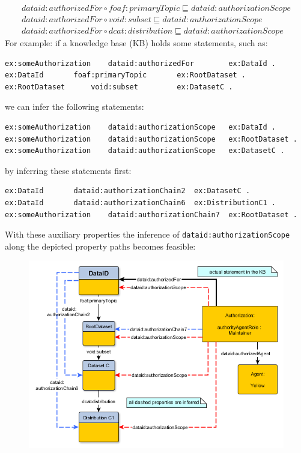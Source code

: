 \documentclass[a4paper,english,twoside,BCOR1.5cm,headsepline,DIV12,appendixprefix,final,12pt]{scrbook}
\newcommand{\prop}[1]{{{\texttt{#1}}}}
\begin{document}
{\footnotesize
\vspace*{-0.5cm}
\begin{align*}
dataid:authorizedFor \circ foaf:primaryTopic \sqsubseteq dataid:authorizationScope\\
dataid:authorizedFor \circ void:subset \sqsubseteq dataid:authorizationScope\\
dataid:authorizedFor \circ dcat:distribution \sqsubseteq dataid:authorizationScope
\end{align*}
}%
For example: if a knowledge base (KB) holds some statements, such as:
\begin{lstlisting}[language=ttl, captionpos=b,label=lst:coresuperset,linewidth=\columnwidth,breaklines=true]
ex:someAuthorization	dataid:authorizedFor		ex:DataId .
ex:DataId		foaf:primaryTopic		ex:RootDataset .
ex:RootDataset		void:subset			ex:DatasetC . 
\end{lstlisting}

we can infer the following statements:
\begin{lstlisting}[language=ttl, captionpos=b,label=lst:coresuperset,linewidth=\columnwidth,breaklines=true]
ex:someAuthorization 	dataid:authorizationScope 	ex:DataId .
ex:someAuthorization 	dataid:authorizationScope 	ex:RootDataset .
ex:someAuthorization 	dataid:authorizationScope 	ex:DatasetC . 
\end{lstlisting}

by inferring these statements first:	
\begin{lstlisting}[language=ttl, captionpos=b,label=lst:coresuperset,linewidth=\columnwidth,breaklines=true]
ex:DataId 		dataid:authorizationChain2 	ex:DatasetC .
ex:DataId	 	dataid:authorizationChain6 	ex:DistributionC1 .
ex:someAuthorization 	dataid:authorizationChain7 	ex:RootDataset .
\end{lstlisting}

With these auxiliary properties the inference of \prop{dataid:authorizationScope} along the depicted property paths becomes feasible:


\begin{figure}[!htbp]
\centering
  \includegraphics[width=12cm]{images/AuthorizationExample.png}
  \label{fig:dlaxioms}
\end{figure}
\end{document}
